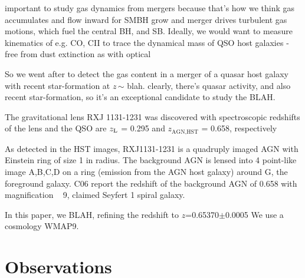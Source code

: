 \documentclass[]{emulateapj}
\begin{document}
important to study gas dynamics from mergers because that's how we think gas accumulates and flow inward for SMBH grow
and merger drives turbulent gas motions, which fuel the central BH, and SB. 
Ideally, we would want to measure kinematics of e.g. CO, CII to trace the dynamical mass of QSO host galaxies
    - free from dust extinction as with optical

So we went after to detect the gas content in a merger of a quasar host galaxy with recent star-formation at $z$\,$\sim$ blah. 
clearly, there's quasar activity, and also recent star-formation, so it's an exceptional candidate to study the BLAH.


The gravitational lens RXJ 1131-1231 was discovered with spectroscopic
redshifts of the lens and the QSO are $z_{\rm L}$ = 0.295 and
$z_\textrm{AGN,HST}$ =
0.658, respectively \citep{}

As detected in the HST images, RXJ1131-1231 is a quadruply imaged AGN with
Einstein ring of size 1 in radius. The
background AGN is lensed into 4 point-like image A,B,C,D on a ring (emission
from the AGN host galaxy) around G, the foreground galaxy.
C06 report the redshift of the background AGN of 0.658 with magnification ~ 9,
claimed Seyfert 1 spiral galaxy.

In this paper, we BLAH, refining the redshift to $z$=0.65370$\pm$0.0005
We use a cosmology WMAP9.



\section{Observations}
\end{document}
